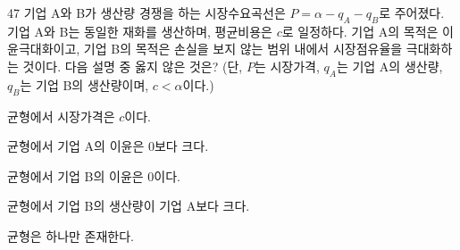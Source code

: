 \begin{question}{47}
기업 A와 B가 생산량 경쟁을 하는 시장수요곡선은 ${ P=\alpha-q_{ A } -q_{ B } }$로 주어졌다. 기업 A와 B는 동일한 재화를 생산하며, 평균비용은 ${ c }$로 일정하다. 기업 A의 목적은 이윤극대화이고, 기업 B의 목적은 손실을 보지 않는 범위 내에서 시장점유율을 극대화하는 것이다. 다음 설명 중 옳지 않은 것은? (단, ${ P }$는 시장가격, ${ q_{ A } }$는 기업 A의 생산량, ${ q_{ B } }$는 기업 B의 생산량이며, ${ c< \alpha }$이다.)
\begin{choices}
  \item 균형에서 시장가격은 $c$이다.
  \item 균형에서 기업 A의 이윤은 0보다 크다.
  \item 균형에서 기업 B의 이윤은 0이다.
  \item 균형에서 기업 B의 생산량이 기업 A보다 크다.
  \item 균형은 하나만 존재한다.
\end{choices}
\end{question}
